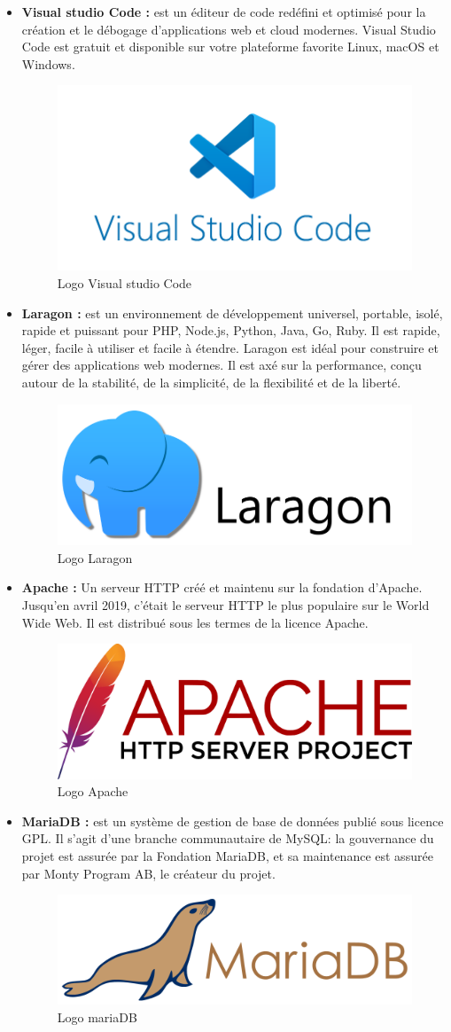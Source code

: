 \begin{itemize}
	\item \textbf{Visual studio Code\cite{vscode} :} est un éditeur de code redéfini et optimisé pour la création et le débogage d'applications web et cloud modernes.  Visual Studio Code est gratuit et disponible sur votre plateforme favorite Linux, macOS et Windows.
	\begin{figure}[H]
		\centering
		\includegraphics[width=0.3\linewidth]{img/logos/vscode}
		\caption[Logo Visual studio Code]{Logo Visual studio Code}
		\label{fig:vscode}
	\end{figure}
	\item \textbf{Laragon\cite{laragon} :} est un environnement de développement universel, portable, isolé, rapide et puissant pour PHP, Node.js, Python, Java, Go, Ruby. Il est rapide, léger, facile à utiliser et facile à étendre. Laragon est idéal pour construire et gérer des applications web modernes. Il est axé sur la performance, conçu autour de la stabilité, de la simplicité, de la flexibilité et de la liberté.
	\begin{figure}[H]
		\centering
		\includegraphics[width=0.2\linewidth]{img/logos/laragon}
		\caption[Logo Laragon]{Logo Laragon}
		\label{fig:laragon}
	\end{figure}
	\item \textbf{Apache\cite{apache} :} Un serveur HTTP créé et maintenu sur la fondation d'Apache. Jusqu'en avril 2019, c'était le serveur HTTP le plus populaire sur le World Wide Web. Il est distribué sous les termes de la licence Apache.
	\begin{figure}[H]
		\centering
		\includegraphics[width=0.2\linewidth]{img/logos/apache}
		\caption[Logo Apache]{Logo Apache}
		\label{fig:apache}
	\end{figure}
	
	\item \textbf{MariaDB\cite{mariadb} :} est un système de gestion de base de données publié sous licence GPL. Il s'agit d'une branche communautaire de MySQL: la gouvernance du projet est assurée par la Fondation MariaDB, et sa maintenance est assurée par Monty Program AB, le créateur du projet.
	\begin{figure}[H]
		\centering
		\includegraphics[width=0.2\linewidth]{img/logos/mariadb}
		\caption[Logo MariaDB]{Logo mariaDB}
		\label{fig:mariadb}
	\end{figure}
	

\end{itemize}
